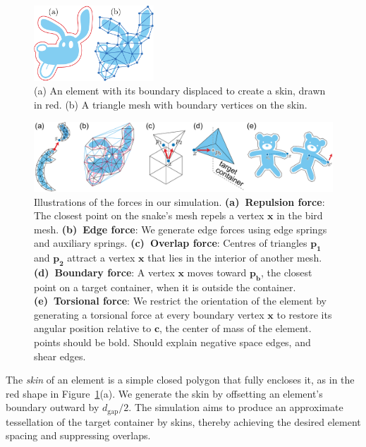 \begin{figure}[t] %
\centering
\includegraphics[width=4.5cm]{figures/repulsionpak/element_skin_triangles_2.pdf}
\caption[Element discretization]{
	\label{fig_elements_image}
	(a) An element with its boundary displaced to create a skin, drawn in red.
	(b) A triangle mesh with boundary vertices on the skin.
}
\end{figure}

\begin{figure}[t]
\centering
\includegraphics[width=1.0\textwidth]{figures/repulsionpak/all_forces_new.pdf}
\caption[Forces]{
\label{fig_forces}
Illustrations of the forces in our simulation.
\;\textbf{(a)~Repulsion force}:
The closest point on the snake's mesh
repels a vertex $\bm{x}$ in the bird mesh.
\textbf{(b)~Edge force}: 
We generate edge forces using
edge springs and auxiliary springs.
\textbf{(c)~Overlap force}: 
Centres of triangles $\bm{p_1}$ and $\bm{p_2}$ attract a vertex
$\bm{x}$ that lies in the interior of another mesh.
\;\textbf{(d)~Boundary force}: A vertex $\bm{x}$ moves toward $\bm{p_b}$,
the closest point on a target container, when it is outside the container.
\textbf{(e)~Torsional force}: We restrict the orientation of the element by generating 
a torsional force at every boundary vertex $\bm{x}$
to restore its angular position relative to $\bm{c}$, 
the center of mass of the element.
\mynote
{
points should be bold.
Should explain negative space edges, and shear edges.
}
}
\end{figure}


The \textit{skin} of an element is a simple closed polygon 
that fully encloses it, 
as in the red shape in Figure~\ref{fig_elements_image}(a).
We generate the skin 
by offsetting 
an element's boundary outward by $d_\mathrm{gap}/2$. 
The simulation aims to produce an approximate tessellation of the target
container by  skins, thereby achieving the desired element spacing and
suppressing overlaps.

